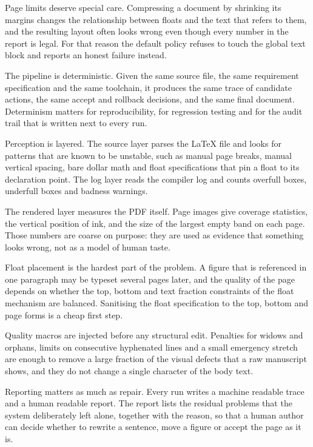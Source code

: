 \documentclass[10pt,a4paper]{article}
\begin{document}
Page limits deserve special care. Compressing a document by shrinking its margins changes the relationship between floats and the text that refers to them, and the resulting layout often looks wrong even though every number in the report is legal. For that reason the default policy refuses to touch the global text block and reports an honest failure instead.

The pipeline is deterministic. Given the same source file, the same requirement specification and the same toolchain, it produces the same trace of candidate actions, the same accept and rollback decisions, and the same final document. Determinism matters for reproducibility, for regression testing and for the audit trail that is written next to every run.

Perception is layered. The source layer parses the LaTeX file and looks for patterns that are known to be unstable, such as manual page breaks, manual vertical spacing, bare dollar math and float specifications that pin a float to its declaration point. The log layer reads the compiler log and counts overfull boxes, underfull boxes and badness warnings.

The rendered layer measures the PDF itself. Page images give coverage statistics, the vertical position of ink, and the size of the largest empty band on each page. Those numbers are coarse on purpose: they are used as evidence that something looks wrong, not as a model of human taste.

Float placement is the hardest part of the problem. A figure that is referenced in one paragraph may be typeset several pages later, and the quality of the page depends on whether the top, bottom and text fraction constraints of the float mechanism are balanced. Sanitising the float specification to the top, bottom and page forms is a cheap first step.

Quality macros are injected before any structural edit. Penalties for widows and orphans, limits on consecutive hyphenated lines and a small emergency stretch are enough to remove a large fraction of the visual defects that a raw manuscript shows, and they do not change a single character of the body text.

Reporting matters as much as repair. Every run writes a machine readable trace and a human readable report. The report lists the residual problems that the system deliberately left alone, together with the reason, so that a human author can decide whether to rewrite a sentence, move a figure or accept the page as it is.
\end{document}
